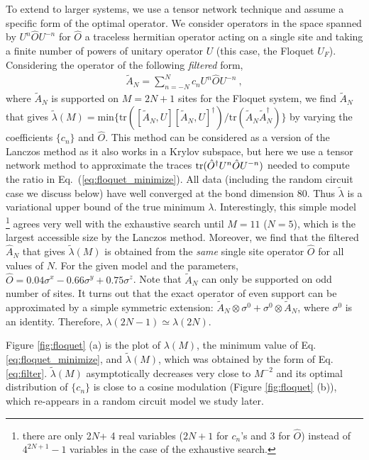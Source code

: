 \documentclass[twocolumn,superscriptaddress, prl,showpacs]{revtex4-1}
\begin{document}
To extend to larger systems, we use a tensor network technique and assume a specific form of the optimal operator.
We consider operators in the space spanned by $U^n \hat{O} U^{- n}$ for $\hat{O}$ a traceless hermitian operator acting on a single site
and taking a finite number of powers of unitary operator $U$ (this case, the Floquet $U_F$).
Considering the operator of the following {\it filtered} form,
\begin{align}
 \tilde{A}_N=\sum_{n=-N}^N c_n U^n \hat{O} U^{- n} ~,
 \label{eq:filter}
\end{align}
where $\tilde{A}_N$ is supported on $M = 2N+1$ sites for the Floquet system,
we find $\tilde{A}_N$ that gives $\tilde{\lambda}(M) = \mathrm{min}\{\mathrm{tr}([\tilde{A}_N,U][\tilde{A}_N,U]^\dag)/\mathrm{tr}(\tilde{A}_N\tilde{A}_N^\dag)\}$
by varying the coefficients $\{c_n\}$ and $\hat{O}$.
This method can be considered as a version of the Lanczos method as it also works in a Krylov subspace,
but here we use a tensor network method to approximate the traces ${\rm tr}(\hat{O}^\dagger U^n \hat{O} U^{-n})$ needed to compute the ratio in Eq.~(\ref{eq:floquet_minimize}). All data (including the random circuit case we discuss below) have well converged at the bond dimension 80.
Thus $\tilde{\lambda}$ is a variational upper bound of the true minimum $\lambda$.
Interestingly, this simple model \footnote{there are only 2$N$+ 4 real variables ($2N+1$ for $c_n$'s and 3 for $\hat{O}$) instead of $4^{2N+1} - 1$ variables
in the case of the exhaustive search.}
agrees very well with the exhaustive search until $M = 11$ ($N = 5$), which is the largest accessible size by the Lanczos method.
Moreover, we find that the filtered $\hat{A}_N$ that gives $\tilde{\lambda}(M)$
is obtained from the {\it same} single site operator $\hat{O}$ for all values of $N$.
For the given model and the parameters, $\hat{O} = 0.04\sigma^x  - 0.66\sigma^y + 0.75\sigma^z$.
Note that $\tilde{A}_N$ can only be supported on odd number of sites.
It turns out that the exact operator of even support can be approximated by a simple symmetric extension:
$\tilde{A}_N\otimes \sigma^0 + \sigma^0\otimes\tilde{A}_N$, where $\sigma^0$ is an identity.
Therefore, $\lambda(2N-1) \simeq \lambda(2N)$.


Figure \ref{fig:floquet} (a) is the plot of $\lambda (M)$, the minimum value of Eq. \ref{eq:floquet_minimize}, and
$\tilde{\lambda}(M)$, which was obtained by the form of Eq. \eqref{eq:filter}.
$\tilde{\lambda}(M)$ asymptotically decreases very close to $M^{-2}$
and its optimal distribution of $\{ c_n\}$ is close to a cosine modulation (Figure \ref{fig:floquet} (b)),
which re-appears in a random circuit model we study later.
\end{document}
